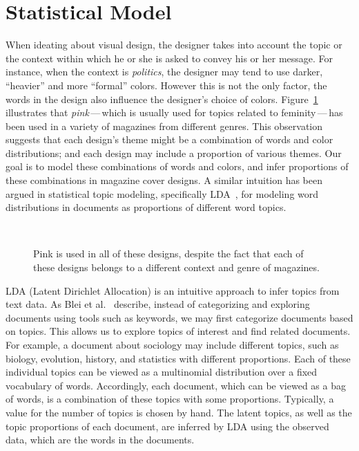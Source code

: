\documentclass[prodmode,acmtochi]{acmsmall}
\begin{document}
\section{Statistical Model}
\label{sec:StatisticalModel}

When ideating about visual design, the designer takes into account the topic or
the context within which he or she is asked to convey his or her message.  For
instance, when the context is \emph{politics}, the designer may tend to use darker, ``heavier'' and more ``formal'' colors.
However this is not the only factor, the words in the design also
influence the designer's choice of colors. Figure~\ref{PinkInDesign}
illustrates that \emph{pink}\,---\,which is usually used for topics related to feminity\,---\,has been used in a variety of magazines from
different genres.  This observation suggests that each design's
theme might be a combination of words and color distributions; and each
design may include a proportion of various themes.
Our goal is to model these combinations of words and colors, and infer proportions of these combinations in magazine cover designs.
A similar intuition
has been argued in statistical topic modeling, specifically
LDA~\cite{blei2003latent}, for modeling word distributions in documents as proportions of different word topics.

\begin{figure}[h!tb]\tiny
  \centering
   \ \
   \ \
   \ \
  \caption{Pink is used in all of these designs, despite the fact that each of these designs belongs to a different context and genre of magazines.}\label{PinkInDesign}
\end{figure}

LDA (Latent Dirichlet Allocation) is an intuitive approach to infer
topics from text data.  As Blei et
al.~\cite{blei2003latent,Blei:2012:PTM} describe, instead of
categorizing and exploring documents using tools such as keywords, we
may first categorize documents based on topics.  This allows us to
explore topics of interest and find related documents.  For example, a
document about sociology may include different topics, such as biology,
evolution, history, and statistics with different proportions.  Each of
these individual topics can be viewed as a multinomial distribution over
a fixed vocabulary of words. Accordingly, each document, which can be
viewed as a bag of words, is a combination of these topics with some
proportions.  Typically, a value for the number of topics is chosen by
hand. The latent topics, as well as the topic proportions of each
document, are inferred by LDA using the observed data, which are the words
in the documents.
\end{document}
